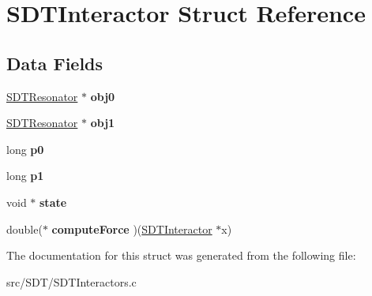 \hypertarget{struct_s_d_t_interactor}{}\section{S\+D\+T\+Interactor Struct Reference}
\label{struct_s_d_t_interactor}
\subsection*{Data Fields}
\begin{DoxyCompactItemize}
\item 
\hypertarget{struct_s_d_t_interactor_a10538b122230fd4f6f422b77bd60e079}{}\hyperlink{struct_s_d_t_resonator}{S\+D\+T\+Resonator} $\ast$ {\bfseries obj0}\label{struct_s_d_t_interactor_a10538b122230fd4f6f422b77bd60e079}

\item 
\hypertarget{struct_s_d_t_interactor_ac7c192100766f6726226a60ba36b2cba}{}\hyperlink{struct_s_d_t_resonator}{S\+D\+T\+Resonator} $\ast$ {\bfseries obj1}\label{struct_s_d_t_interactor_ac7c192100766f6726226a60ba36b2cba}

\item 
\hypertarget{struct_s_d_t_interactor_a655a007edd262b8cc09c88871d5c5c6f}{}long {\bfseries p0}\label{struct_s_d_t_interactor_a655a007edd262b8cc09c88871d5c5c6f}

\item 
\hypertarget{struct_s_d_t_interactor_a478d32aa4a2511dc42db713fbe78498e}{}long {\bfseries p1}\label{struct_s_d_t_interactor_a478d32aa4a2511dc42db713fbe78498e}

\item 
\hypertarget{struct_s_d_t_interactor_a441a9214dea76f74bf9d8b392cf4d355}{}void $\ast$ {\bfseries state}\label{struct_s_d_t_interactor_a441a9214dea76f74bf9d8b392cf4d355}

\item 
\hypertarget{struct_s_d_t_interactor_a3a97958fb93ac38b85dce194505936ac}{}double($\ast$ {\bfseries compute\+Force} )(\hyperlink{struct_s_d_t_interactor}{S\+D\+T\+Interactor} $\ast$x)\label{struct_s_d_t_interactor_a3a97958fb93ac38b85dce194505936ac}

\end{DoxyCompactItemize}


The documentation for this struct was generated from the following file\+:\begin{DoxyCompactItemize}
\item 
src/\+S\+D\+T/S\+D\+T\+Interactors.\+c\end{DoxyCompactItemize}
